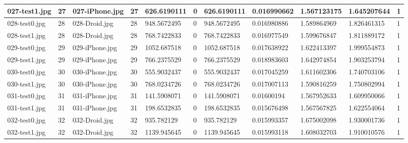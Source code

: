 \begin{landscape}
\begin{longtable}{|p{2cm}|p{1cm}|p{2cm}|p{1cm}|p{2cm}|p{1cm}|p{2cm}|p{2cm}|p{2cm}|p{2cm}|p{1cm}|}
	\hline
	027-test1.jpg & 27       & 027-iPhone.jpg & 27                   & 626.6190111   & 0                & 626.6190111         & 0.016990662   & 1.567123175   & 1.645207644       & 1         \\ 
	\hline
	028-test0.jpg & 28       & 028-Droid.jpg  & 28                   & 948.5672495   & 0                & 948.5672495         & 0.016980886   & 1.589864969   & 1.826461315       & 1         \\ 
	\hline
	028-test1.jpg & 28       & 028-Droid.jpg  & 28                   & 768.7422833   & 0                & 768.7422833         & 0.016977549   & 1.599676847   & 1.811889172       & 1         \\ 
	\hline
	029-test0.jpg & 29       & 029-iPhone.jpg & 29                   & 1052.687518   & 0                & 1052.687518         & 0.017638922   & 1.622413397   & 1.999554873       & 1         \\ 
	\hline
	029-test1.jpg & 29       & 029-iPhone.jpg & 29                   & 766.2375529   & 0                & 766.2375529         & 0.018983603   & 1.642974854   & 1.903253794       & 1         \\ 
	\hline
	030-test0.jpg & 30       & 030-iPhone.jpg & 30                   & 555.9032437   & 0                & 555.9032437         & 0.017045259   & 1.611602306   & 1.740703106       & 1         \\ 
	\hline
	030-test1.jpg & 30       & 030-iPhone.jpg & 30                   & 768.0234726   & 0                & 768.0234726         & 0.017007113   & 1.590816259   & 1.750802994       & 1         \\ 
	\hline
	031-test0.jpg & 31       & 031-iPhone.jpg & 31                   & 141.5908071   & 0                & 141.5908071         & 0.01600194    & 1.567952633   & 1.609950066       & 1         \\ 
	\hline
	031-test1.jpg & 31       & 031-iPhone.jpg & 31                   & 198.6532835   & 0                & 198.6532835         & 0.015676498   & 1.567567825   & 1.622554064       & 1         \\ 
	\hline
	032-test0.jpg & 32       & 032-Droid.jpg  & 32                   & 935.782129    & 0                & 935.782129          & 0.015993357   & 1.675002098   & 1.930001736       & 1         \\ 
	\hline
	032-test1.jpg & 32       & 032-Droid.jpg  & 32                   & 1139.945645   & 0                & 1139.945645         & 0.015993118   & 1.608032703   & 1.910010576       & 1         \\ 

\end{longtable}
\end{landscape}
